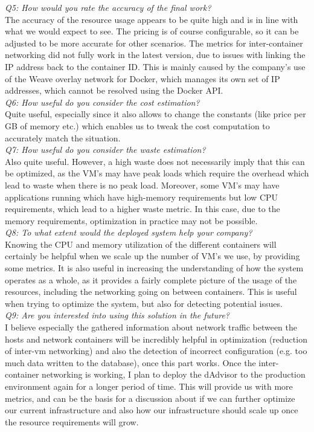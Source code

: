 \noindent
\textit{Q5: How would you rate the accuracy of the final work?}\\
The accuracy of the resource usage appears to be quite high and is in line with what we would expect to see.
The pricing is of course configurable, so it can be adjusted to be more accurate for other scenarios.
The metrics for inter-container networking did not fully work in the latest version, due to issues with linking the IP address back to the container ID. This is mainly caused by the company's use of the Weave overlay network for Docker, which manages its own set of IP addresses, which cannot be resolved using the Docker API.\\

\noindent
\textit{Q6: How useful do you consider the cost estimation?}\\
Quite useful, especially since it also allows to change the constants (like price per GB of memory etc.) which enables us to tweak the cost computation to accurately match the situation.\\

\noindent
\textit{Q7: How useful do you consider the waste estimation?}\\
Also quite useful. However, a high waste does not necessarily imply that this can be optimized, as the VM's may have peak loads which require the overhead which lead to waste when there is no peak load.
Moreover, some VM's may have applications running which have high-memory requirements but low CPU requirements, which lead to a higher waste metric. In this case, due to the memory requirements, optimization in practice may not be possible.\\

\noindent
\textit{Q8: To what extent would the deployed system help your company?}\\
Knowing the CPU and memory utilization of the different containers will certainly be helpful when we scale up the number of VM's we use, by providing some metrics.
It is also useful in increasing the understanding of how the system operates as a whole, as it provides a fairly complete picture of the usage of the resources, including the networking going on between containers. This is useful when trying to optimize the system, but also for detecting potential issues.\\

\noindent
\textit{Q9: Are you interested into using this solution in the future?}\\	
I believe especially the gathered information about network traffic between the hosts and network containers will be incredibly helpful in optimization (reduction of inter-vm networking) and also the detection of incorrect configuration (e.g. too much data written to the database), once this part works.
Once the inter-container networking is working, I plan to deploy the dAdvisor to the production environment again for a longer period of time. This will provide us with more metrics, and can be the basis for a discussion about if we can further optimize our current infrastructure and also how our infrastructure should scale up once the resource requirements will grow.\\